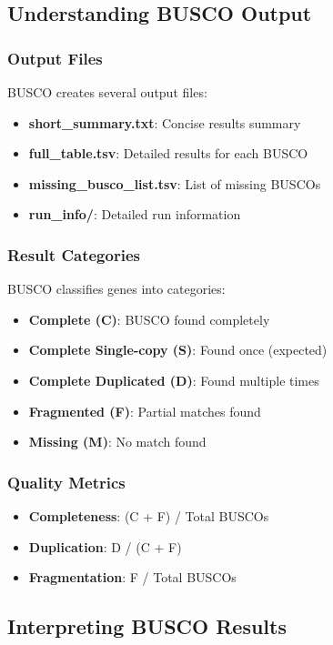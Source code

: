 \subsection{Understanding BUSCO Output}

\subsubsection{Output Files}
BUSCO creates several output files:
\begin{itemize}
    \item \textbf{short\_summary.txt}: Concise results summary
    \item \textbf{full\_table.tsv}: Detailed results for each BUSCO
    \item \textbf{missing\_busco\_list.tsv}: List of missing BUSCOs
    \item \textbf{run\_info/}: Detailed run information
\end{itemize}

\subsubsection{Result Categories}
BUSCO classifies genes into categories:
\begin{itemize}
    \item \textbf{Complete (C)}: BUSCO found completely
    \item \textbf{Complete Single-copy (S)}: Found once (expected)
    \item \textbf{Complete Duplicated (D)}: Found multiple times
    \item \textbf{Fragmented (F)}: Partial matches found
    \item \textbf{Missing (M)}: No match found
\end{itemize}

\subsubsection{Quality Metrics}
\begin{itemize}
    \item \textbf{Completeness}: (C + F) / Total BUSCOs
    \item \textbf{Duplication}: D / (C + F)
    \item \textbf{Fragmentation}: F / Total BUSCOs
\end{itemize}

\subsection{Interpreting BUSCO Results}

